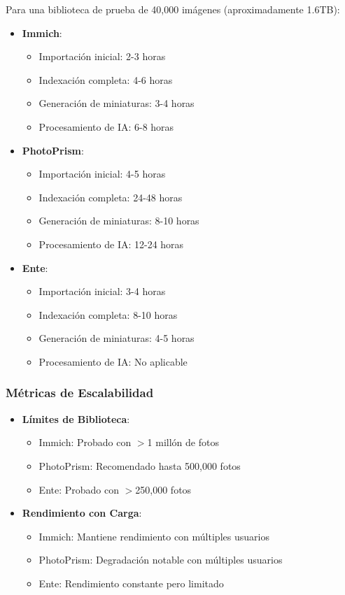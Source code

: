 Para una biblioteca de prueba de 40,000 imágenes (aproximadamente 1.6TB):

\begin{itemize}
    \item \textbf{Immich}:
    \begin{itemize}
        \item Importación inicial: 2-3 horas
        \item Indexación completa: 4-6 horas
        \item Generación de miniaturas: 3-4 horas
        \item Procesamiento de IA: 6-8 horas
    \end{itemize}
    
    \item \textbf{PhotoPrism}:
    \begin{itemize}
        \item Importación inicial: 4-5 horas
        \item Indexación completa: 24-48 horas
        \item Generación de miniaturas: 8-10 horas
        \item Procesamiento de IA: 12-24 horas
    \end{itemize}
    
    \item \textbf{Ente}:
    \begin{itemize}
        \item Importación inicial: 3-4 horas
        \item Indexación completa: 8-10 horas
        \item Generación de miniaturas: 4-5 horas
        \item Procesamiento de IA: No aplicable
    \end{itemize}
\end{itemize}

\subsubsection{Métricas de Escalabilidad}

\begin{itemize}
    \item \textbf{Límites de Biblioteca}:
    \begin{itemize}
        \item Immich: Probado con $>$1 millón de fotos
        \item PhotoPrism: Recomendado hasta 500,000 fotos
        \item Ente: Probado con $>$250,000 fotos
    \end{itemize}
    
    \item \textbf{Rendimiento con Carga}:
    \begin{itemize}
        \item Immich: Mantiene rendimiento con múltiples usuarios
        \item PhotoPrism: Degradación notable con múltiples usuarios
        \item Ente: Rendimiento constante pero limitado
    \end{itemize}
\end{itemize}

